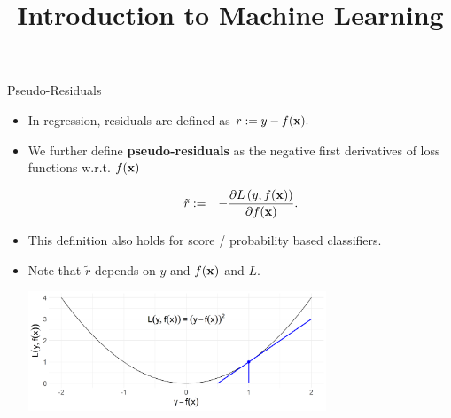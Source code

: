 \documentclass[11pt,compress,t,notes=noshow, xcolor=table]{beamer}
\title{Introduction to Machine Learning}
\begin{document}
    

\begin{vbframe}{Pseudo-Residuals}

\begin{itemize}
	\item In regression, residuals are defined as $
			r := y - f(\mathbf{x}).$
\item We further define \textbf{pseudo-residuals} as the negative first derivatives of loss functions w.r.t. $f(\mathbf{x})$

\vspace*{-0.3cm}
  \begin{eqnarray*}
    \tilde r &:=& - \frac{\partial \Lxy}{\partial \fx}.  %
  \end{eqnarray*}
\item This definition also holds for score / probability based classifiers.
\item Note that $\tilde{r}$ depends on $y$ and $f(\mathbf{x})$ and $L$. %

\vfill

\includegraphics[width=0.7\textwidth]{figure/plot_quad_pseudores.png}

\end{itemize}

\end{vbframe}
\end{document}

